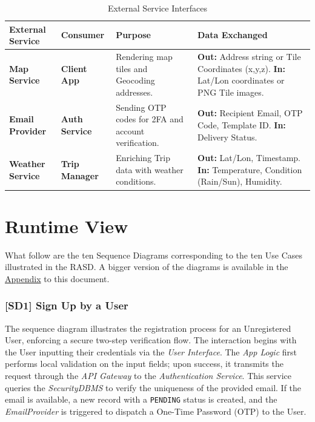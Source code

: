 \begin{table}[H]
\sf
\small
\centering
\renewcommand{\arraystretch}{1.5}
\begin{tabularx}{\textwidth}{|l|l|X|X|}
\hline
\rowcolor{lightgray} \textbf{External Service} & \textbf{Consumer} & \textbf{Purpose} & \textbf{Data Exchanged} \\ \hline

\textbf{Map Service} & 
\textbf{Client App} & 
Rendering map tiles and Geocoding addresses. & 
\textbf{Out:} Address string or Tile Coordinates (x,y,z). \newline
\textbf{In:} Lat/Lon coordinates or PNG Tile images. \\ \hline

\textbf{Email Provider} & 
\textbf{Auth Service} & 
Sending OTP codes for 2FA and account verification. & 
\textbf{Out:} Recipient Email, OTP Code, Template ID. \newline
\textbf{In:} Delivery Status. \\ \hline

\textbf{Weather Service} & 
\textbf{Trip Manager} & 
Enriching Trip data with weather conditions. & 
\textbf{Out:} Lat/Lon, Timestamp. \newline
\textbf{In:} Temperature, Condition (Rain/Sun), Humidity. \\ \hline
\end{tabularx}
\caption{External Service Interfaces}
\label{tab:api_external}
\end{table}

\newpage

\section{Runtime View}
What follow are the ten Sequence Diagrams corresponding to the ten Use Cases illustrated in the RASD. A bigger version of the diagrams is available in the \hyperref[sec:appendix_diagrams]{Appendix} to this document.

\subsubsection*{[SD1] Sign Up by a User}
The sequence diagram illustrates the registration process for an Unregistered User, enforcing a secure two-step verification flow. The interaction begins with the User inputting their credentials via the \emph{User Interface}. The \emph{App Logic} first performs local validation on the input fields; upon success, it transmits the request through the \emph{API Gateway} to the \emph{Authentication Service}. This service queries the \emph{SecurityDBMS} to verify the uniqueness of the provided email. If the email is available, a new record with a \texttt{PENDING} status is created, and the \emph{EmailProvider} is triggered to dispatch a One-Time Password (OTP) to the User.

